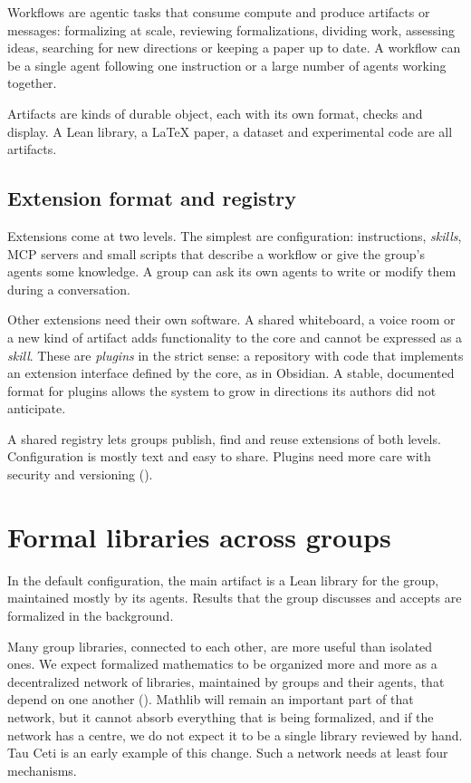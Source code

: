 \documentclass{article}
\begin{document}
Workflows are agentic tasks that consume compute and produce artifacts or messages: formalizing at scale, reviewing formalizations, dividing work, assessing ideas, searching for new directions or keeping a paper up to date. A workflow can be a single agent following one instruction or a large number of agents working together.

Artifacts are kinds of durable object, each with its own format, checks and display. A Lean library, a LaTeX paper, a dataset and experimental code are all artifacts.

\subsection{Extension format and registry}

Extensions come at two levels. The simplest are configuration: instructions, \emph{skills}, MCP servers and small scripts that describe a workflow or give the group's agents some knowledge. A group can ask its own agents to write or modify them during a conversation.

Other extensions need their own software. A shared whiteboard, a voice room or a new kind of artifact adds functionality to the core and cannot be expressed as a \emph{skill}. These are \emph{plugins} in the strict sense: a repository with code that implements an extension interface defined by the core, as in Obsidian. A stable, documented format for plugins allows the system to grow in directions its authors did not anticipate.

A shared registry lets groups publish, find and reuse extensions of both levels. Configuration is mostly text and easy to share. Plugins need more care with security and versioning ().

\section{Formal libraries across groups}\label{sec-red}

In the default configuration, the main artifact is a Lean library for the group, maintained mostly by its agents. Results that the group discusses and accepts are formalized in the background.

Many group libraries, connected to each other, are more useful than isolated ones. We expect formalized mathematics to be organized more and more as a decentralized network of libraries, maintained by groups and their agents, that depend on one another (). Mathlib will remain an important part of that network, but it cannot absorb everything that is being formalized, and if the network has a centre, we do not expect it to be a single library reviewed by hand. Tau Ceti \cite{tauceti2026} is an early example of this change. Such a network needs at least four mechanisms.
\end{document}
